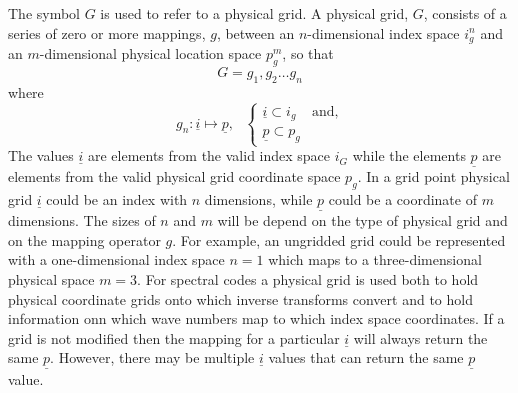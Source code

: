 The symbol $G$ is used to refer to a physical grid. A physical grid, $G$, 
consists of a series of zero or more mappings, $g$, between an 
$n$-dimensional index space 
$i_{g}^n$ and an $m$-dimensional physical location space $p_{g}^m$, so that
\begin{equation}
G = g_{1}, g_{2} \ldots g_{n}
\end{equation}
\noindent where
\begin{equation}
g_{n}: \underline{i} \mapsto \underline{p},~~~
\begin{cases}
  \underline{i} \subset i_{g} & \text{and}, \\
  \underline{p} \subset p_{g} & \text{}
\end{cases}
\end{equation}
The values $\underline{i}$ are elements from the valid index space
$i_{G}$ while the elements $\underline{p}$ are elements
from the valid physical grid coordinate space $p_{g}$.
In a grid point physical grid $\underline{i}$ could be
an index with $n$ dimensions, while $\underline{p}$ could
be a coordinate of $m$ dimensions. The sizes of 
$n$ and $m$ will be depend on the type of physical 
grid and on the mapping operator $g$. For example, an ungridded 
grid could be represented with a one-dimensional index space $n=1$ 
which maps to a three-dimensional physical space $m=3$.
For spectral codes a physical grid is used both
to hold physical coordinate grids onto which inverse transforms
convert and to hold information onn which wave numbers map
to which index space coordinates.
If a grid is not modified then the mapping for a particular
$\underline{i}$ will always return the same $\underline{p}$.
However, there may be multiple $\underline{i}$ values that
can return the same $\underline{p}$ value.
